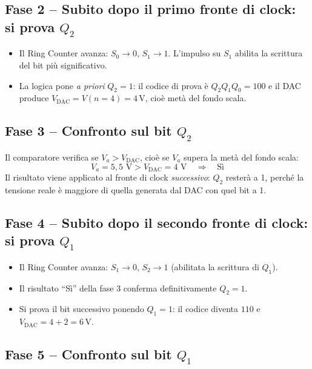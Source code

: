 \subsection*{Fase 2 -- Subito dopo il primo fronte di clock: si prova $Q_2$}

\begin{itemize}[leftmargin=1.5em, itemsep=2pt]
    \item Il Ring Counter avanza: $S_0 \to 0$, $S_1 \to 1$. L'impulso su $S_1$ abilita la
          scrittura del bit più significativo.
    \item La logica pone \emph{a priori} $Q_2 = 1$: il codice di prova è $Q_2Q_1Q_0 = 100$ e
          il DAC produce $V_{\text{DAC}} = V(n{=}4) = 4$\,V, cioè metà del fondo scala.
\end{itemize}

\subsection*{Fase 3 -- Confronto sul bit $Q_2$}

Il comparatore verifica se $V_a > V_{\text{DAC}}$, cioè se $V_a$ supera la metà del fondo
scala:
\[
V_a = 5{,}5\text{ V} > V_{\text{DAC}} = 4\text{ V} \quad\Longrightarrow\quad \text{Sì}
\]
Il risultato viene applicato al fronte di clock \emph{successivo}: $Q_2$ resterà a 1, perché
la tensione reale è maggiore di quella generata dal DAC con quel bit a 1.

\subsection*{Fase 4 -- Subito dopo il secondo fronte di clock: si prova $Q_1$}

\begin{itemize}[leftmargin=1.5em, itemsep=2pt]
    \item Il Ring Counter avanza: $S_1\to 0$, $S_2\to 1$ (abilitata la scrittura di $Q_1$).
    \item Il risultato ``Sì'' della fase 3 conferma definitivamente $Q_2=1$.
    \item Si prova il bit successivo ponendo $Q_1=1$: il codice diventa $110$ e
          $V_{\text{DAC}} = 4 + 2 = 6$\,V.
\end{itemize}

\subsection*{Fase 5 -- Confronto sul bit $Q_1$}

